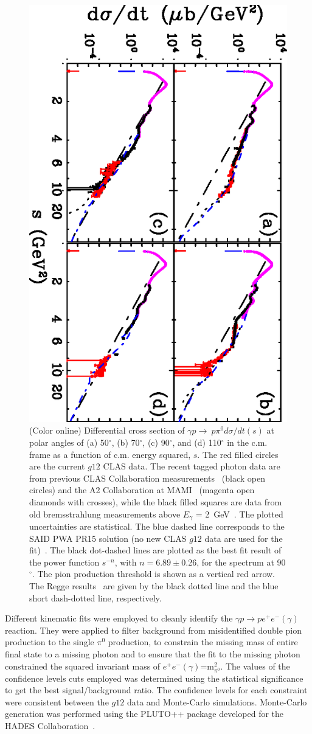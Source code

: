 \documentclass[aps,prc,twocolumn,floatfix,showpacs,preprintnumbers,amsmath,amssymb,superscriptaddress,linenumbers]{revtex4-1}
\begin{document}
\begin{figure}[htb!]
	\centerline{
		\includegraphics[height=0.65\textwidth, angle=90]{scale.eps}}
	\caption {(Color online) Differential cross section of 
		$\gamma p\rightarrow\  p\pi^0 d \sigma/dt(s)$ at polar angles 
		of (a) 50$^\circ$, (b) 70$^\circ$, 
		(c) 90$^\circ$, and (d) 
		110$^\circ$ in the c.m. frame as a function of c.m. energy 
		squared, $s$. The red filled circles are the current $g12$ 
		CLAS data. The recent tagged photon data are from previous 
		CLAS Collaboration 
		measurements~\protect\cite{Dugger:2007bt} (black open 
		circles) and the A2 Collaboration at 
		MAMI~\protect\cite{Adlarson:2015byy} 
		(magenta open diamonds with crosses), while the black filled 
		squares are data from old bremsstrahlung measurements above 
		$E_{\gamma}$ = 2~GeV~\protect\cite{brem}. The plotted uncertainties are 
		statistical.  
		The blue dashed line corresponds to the SAID PWA 
		PR15 solution (no new CLAS $g12$ data are used 
		for the fit)~\protect\cite{Adlarson:2015byy}.  The black dot-dashed 
		lines are plotted as the best fit result of the power function $s^{-n}$, with $n = 6.89\pm$0.26, for the spectrum at 
		90$^\circ$. The pion production threshold is shown as a vertical 
		red arrow. The Regge results~\protect\cite{Goldstein:1973xn,
			Laget:2005be} are given by the black dotted line and the blue short dash-dotted line, 
		respectively.} \label{fig:scaling}
\end{figure}
Different kinematic fits were employed to cleanly identify the 
$\gamma p\rightarrow pe^+e^-(\gamma)$ reaction. They were applied 
to filter background from misidentified double pion production to 
the single $\pi^0$ production, to constrain the missing mass of entire 
final state to a missing photon and to ensure that the fit to the missing 
photon constrained the squared invariant 
mass of $e^+e^-(\gamma)$=m$^2_{\pi^0}$. The values of the confidence levels cuts employed was 
determined using the statistical significance to get the best signal/background ratio.
The confidence levels for each constraint were consistent 
between the $g12$ data and Monte-Carlo simulations. 
Monte-Carlo generation was performed using the PLUTO++ package 
developed for the HADES Collaboration~\cite{PLUTO}.
\end{document}
